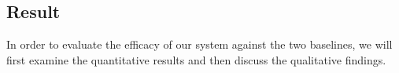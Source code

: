 \subsection{Result}
In order to evaluate the efficacy of our system against the two baselines, we will first examine the quantitative results and then discuss the qualitative findings.

